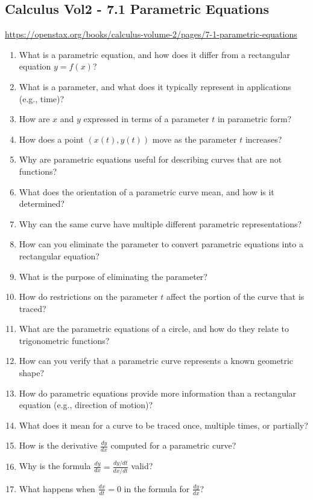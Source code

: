 \subsection{Calculus Vol2 - 7.1 Parametric Equations}

\url{https://openstax.org/books/calculus-volume-2/pages/7-1-parametric-equations}

\begin{enumerate}
  \item What is a parametric equation, and how does it differ from a rectangular equation $y=f(x)$?
  \item What is a parameter, and what does it typically represent in applications (e.g., time)?
  \item How are $x$ and $y$ expressed in terms of a parameter $t$ in parametric form?
  \item How does a point $(x(t), y(t))$ move as the parameter $t$ increases?
  \item Why are parametric equations useful for describing curves that are not functions?
  \item What does the orientation of a parametric curve mean, and how is it determined?
  \item Why can the same curve have multiple different parametric representations?
  \item How can you eliminate the parameter to convert parametric equations into a rectangular equation?
  \item What is the purpose of eliminating the parameter?
  \item How do restrictions on the parameter $t$ affect the portion of the curve that is traced?
  \item What are the parametric equations of a circle, and how do they relate to trigonometric functions?
  \item How can you verify that a parametric curve represents a known geometric shape?
  \item How do parametric equations provide more information than a rectangular equation (e.g., direction of motion)?
  \item What does it mean for a curve to be traced once, multiple times, or partially?
  \item How is the derivative $\frac{dy}{dx}$ computed for a parametric curve?
  \item Why is the formula $\frac{dy}{dx} = \frac{dy/dt}{dx/dt}$ valid?
  \item What happens when $\frac{dx}{dt} = 0$ in the formula for $\frac{dy}{dx}$?

\end{enumerate}
